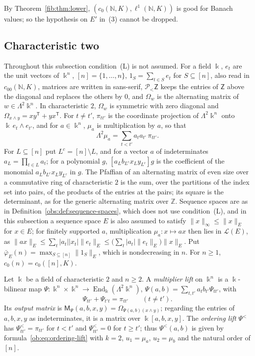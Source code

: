 \documentclass[11pt]{amsart}
\theoremstyle{definition}
\theoremstyle{remark}
\numberwithin{equation}{section}
\newcommand{\N}{\mathbb N}
\newcommand{\Z}{\mathbb Z}
\newcommand{\cL}{\mathcal L}
\newcommand{\abs}[1]{\lvert #1\rvert}
\newcommand{\norm}[1]{\lVert #1\rVert}
\theoremstyle{plain}
\theoremstyle{definition}
\theoremstyle{plain}
\newcommand{\cP}{\mathcal P}
\begin{document}
By Theorem~\ref{fib:thm:lower}, $(c_0(\N,K),\ell^1(\N,K))$ is good for Banach values; so the hypothesis on $E'$ in~(3)
cannot be dropped.

\subsection{Characteristic two}\label{obs:ssec:char-two}
Throughout this subsection condition~\textup{(L)} is not assumed. For a field $\Bbbk$, $e_t$ are the unit vectors of $\Bbbk^n$,
$[n]=\{1,\dots,n\}$, $1_S=\sum_{t\in S}e_t$ for $S\subseteq[n]$, also read in $c_{00}(\N,K)$, matrices are
written in sans-serif, $\cP_<\mathsf Z$ keeps the entries of $\mathsf Z$ above the diagonal and replaces the
others by $0$, and $\Omega_w$ is the alternating matrix of $w\in\Lambda^2\Bbbk^n$. In characteristic $2$, $\Omega_w$ is
symmetric with zero diagonal and $\Omega_{x\wedge y}=xy^{\mathsf T}+yx^{\mathsf T}$. For $t\ne t'$, $\pi_{tt'}$ is the
coordinate projection of $\Lambda^2\Bbbk^n$ onto $\Bbbk\,e_t\wedge e_{t'}$, and for $a\in\Bbbk^n$, $\mu_a$ is
multiplication by $a$, so that
\begin{equation}\label{obs:eq:lambda-mu}
\Lambda^2\mu_a=\sum_{t<t'}a_ta_{t'}\,\pi_{tt'} .
\end{equation}
For $L\subseteq[n]$ put $L^c=[n]\setminus L$, and for a vector $a$ of indeterminates $a_L=\prod_{t\in L}a_t$; for a
polynomial $g$, $[a_Lb_{L^c}x_Ly_{L^c}]g$ is the coefficient of the monomial $a_Lb_{L^c}x_Ly_{L^c}$ in $g$. The
Pfaffian of an alternating matrix of even size over a commutative ring of characteristic $2$ is the sum, over the
partitions of the index set into pairs, of the products of the entries at the pairs; its square is the determinant, as
for the generic alternating matrix over $\Z$. Sequence spaces are as in Definition~\ref{obs:def:sequence-spaces}, which
does not use condition~\textup{(L)}, and in this subsection a sequence space $E$ is also assumed to satisfy
$\norm x_\infty\le\norm x_E$ for $x\in E$; for finitely supported $a$, multiplication $\mu_a\colon x\mapsto ax$ then lies
in $\cL(E)$, as $\norm{ax}_E\le\sum_t\abs{a_t}\abs{x_t}\norm{e_t}_E\le\bigl(\sum_t\abs{a_t}\norm{e_t}_E\bigr)\norm x_E$.
Put $\bar\varphi_E(n)=\max_{S\subseteq[n]}\norm{1_S}_E$, which is nondecreasing in $n$. For $n\ge1$,
$c_0(n)=c_0([n],K)$.

Let $\Bbbk$ be a field of characteristic $2$ and $n\ge2$. A \emph{multiplier lift} on $\Bbbk^n$ is a $\Bbbk$-bilinear
map $\Psi\colon\Bbbk^n\times\Bbbk^n\to\operatorname{End}_\Bbbk(\Lambda^2\Bbbk^n)$,
$\Psi(a,b)=\sum_{t,t'}a_tb_{t'}\Psi_{tt'}$, with
\begin{equation}\label{obs:eq:multiplier-lift}
\Psi_{tt'}+\Psi_{t't}=\pi_{tt'}\qquad(t\ne t').
\end{equation}
Its \emph{output matrix} is $\mathsf M_\Psi(a,b,x,y)=\Omega_{\Psi(a,b)(x\wedge y)}$; regarding the entries of
$a,b,x,y$ as indeterminates, it is a matrix over $\Bbbk[a,b,x,y]$. The \emph{ordering lift} $\Psi^<$ has
$\Psi^<_{tt'}=\pi_{tt'}$ for $t<t'$ and $\Psi^<_{tt'}=0$ for $t\ge t'$; thus $\Psi^<(a,b)$ is given by
formula~\eqref{ob:eq:ordering-lift} with $k=2$, $u_1=\mu_a$, $u_2=\mu_b$ and the natural order of $[n]$.
\end{document}
